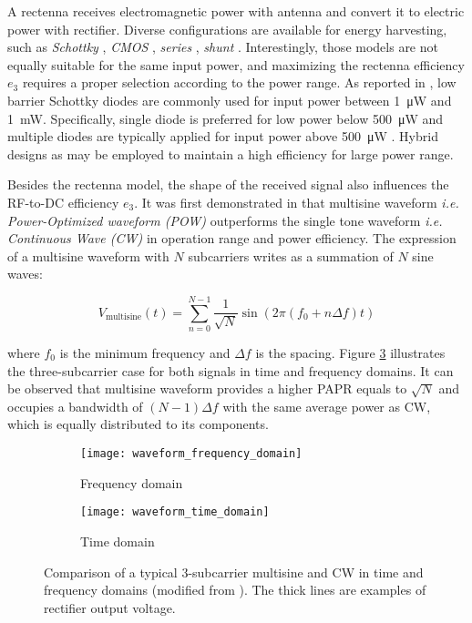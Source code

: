 A rectenna receives electromagnetic power with antenna and convert it to electric power with rectifier. Diverse configurations are available for energy harvesting, such as \textit{Schottky} \cite{Akkermans2005, Boaventura2013}, \textit{CMOS} \cite{Stoopman2014, Valenta2014}, \textit{series} \cite{Georgiadis2011, Collado2013}, \textit{shunt} \cite{McSpadden1998, Guo2012}. Interestingly, those models are not equally suitable for the same input power, and maximizing the rectenna efficiency ${e_3}$ requires a proper selection according to the power range. As reported in \cite{Valenta2014, Costanzo2016}, low barrier Schottky diodes are commonly used for input power between \SI{1}{\uW} and \SI{1}{\mW}. Specifically, single diode is preferred for low power below \SI{500}{\uW} and multiple diodes are typically applied for input power above \SI{500}{\uW} \cite{Clerckx2019}. Hybrid designs as \cite{Sun2013} may be employed to maintain a high efficiency for large power range.

Besides the rectenna model, the shape of the received signal also influences the RF-to-DC efficiency ${e_3}$. It was first demonstrated in \cite{Trotter2009} that multisine waveform \textit{i.e. Power-Optimized waveform (POW)} outperforms the single tone waveform \textit{i.e. Continuous Wave (CW)} in operation range and power efficiency. The expression of a multisine waveform with $N$ subcarriers writes as a summation of $N$ sine waves:

\begin{equation}\label{eqn:multisine}
  {V_{{\text{multisine}}}}(t) = \sum\limits_{n = 0}^{N - 1} {\frac{1}{{\sqrt N }}} \sin \left( {2\pi \left( {{f_{\text{0}}} + n\Delta f} \right)t} \right)
\end{equation}

where ${{f_{\text{0}}}}$ is the minimum frequency and ${\Delta f}$ is the spacing. Figure \ref{fig:waveform_comparison} \cite{Trotter2009} illustrates the three-subcarrier case for both signals in time and frequency domains. It can be observed that multisine waveform provides a higher PAPR equals to ${\sqrt N }$ and occupies a bandwidth of $(N - 1) \Delta f$ with the same average power as CW, which is equally distributed to its components.

\begin{figure}
  \centering
  
  \begin{subfigure}{.5\textwidth}
    \centering
      \texttt{[image: waveform\_frequency\_domain]}
    \caption{Frequency domain}
    \label{fig:waveform_frequency_domain}
  \end{subfigure}

  \begin{subfigure}{.5\textwidth}
    \centering
      \texttt{[image: waveform\_time\_domain]}
    \caption{Time domain}
    \label{fig:waveform_time_domain}
  \end{subfigure}

  \caption{Comparison of a typical 3-subcarrier multisine and CW in time and frequency domains (modified from \cite{Trotter2009}). The thick lines are examples of rectifier output voltage.}
  \label{fig:waveform_comparison}
\end{figure}

